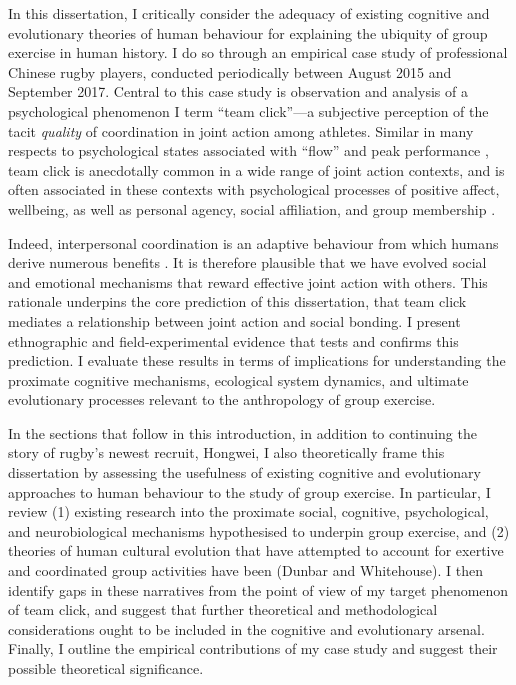 In this dissertation, I critically consider the adequacy of existing cognitive and evolutionary theories of human behaviour for explaining the ubiquity of group exercise in human history.  I do so through an empirical case study of professional Chinese rugby players, conducted periodically between August 2015 and September 2017. Central to this case study is observation and analysis of a psychological phenomenon I term ``team click''---a subjective perception  of the tacit \textit{quality} of coordination in joint action among athletes.  Similar in many respects to psychological states associated with ``flow'' and peak performance \citep{Csikszentmihalyi1992}, team click is anecdotally common in a wide range of joint action contexts, and is often associated in these contexts with psychological processes of positive affect, wellbeing, as well as personal agency, social affiliation, and group membership \citep{Marsh2009, Wheatley2012}.

Indeed, interpersonal coordination is an adaptive behaviour from which humans derive numerous benefits \citep{Tomasello2014}. It is therefore plausible that we have evolved social and emotional mechanisms that reward effective joint action with others. This rationale underpins the core prediction of this dissertation, that team click mediates a relationship between joint action and social bonding.  I present ethnographic and field-experimental evidence that tests and confirms this prediction.  I evaluate these results in terms of implications for understanding the proximate cognitive mechanisms, ecological system dynamics, and ultimate evolutionary processes relevant to the anthropology of group exercise.

In the sections that follow in this introduction, in addition to continuing the story of rugby's newest recruit, Hongwei, I also theoretically frame this dissertation by assessing the usefulness of existing cognitive and evolutionary approaches to human behaviour to the study of group exercise. In particular, I review (1) existing research into the proximate social, cognitive, psychological, and neurobiological mechanisms hypothesised to underpin group exercise, and (2) theories of human cultural evolution that have attempted to account for exertive and coordinated group activities have been (Dunbar and Whitehouse).  I then identify gaps in these narratives from the point of view of my target phenomenon of team click, and suggest that further theoretical and methodological considerations ought to be included in the cognitive and evolutionary arsenal.  Finally, I outline the empirical contributions of my case study and suggest their possible theoretical significance. 





